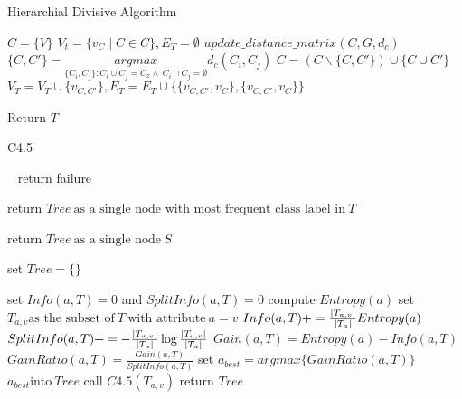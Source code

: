 \documentclass[a4paper]{article}
\begin{document}
  \begin{algorithm}
   \caption{Hierarchial Divisive Algorithm ~\cite{hda1}}
    \begin{algorithmic}[1]
     \State $C = \{ V\} $ 
     \State $V_t = \{v_C\mid C \in C\},E_T = \emptyset$ 
     \State $update\_distance\_matrix(C,G,d_c)$
     \State $\{C,C'\} =  \underset{\{C_i,C_j\}  : C_i \cup C_j = C_x   \wedge \  C_i \cap C_j = \emptyset}{argmax} d_c (C_i,C_j)$
     \State $C = (C \backslash \{C,C'\}) \cup \{C \cup C'\}$ 
     \State $V_T = V_T \cup \{v_{C,C'}\},E_T = E_T \cup \{\{v_{C,C'} ,v_{C}\},\{v_{C,C'} ,v_{C}\}\}$ 
     \EndWhile
    
      
        
       
       \State Return $T$



 

\end{algorithmic}
\end{algorithm}


 \begin{algorithm}
 
   \caption{C4.5  ~\cite{c4.5} }
    \begin{algorithmic}[1]
     \
      \State return failure
      \EndIf
      
      \State return $Tree \  \text{as a single node with most frequent class label in}\  T$ 
      \EndIf
     
      \State return $Tree \  \text{as a single node}\  S $ 
      \EndIf
      
   \State set $Tree = \{\}$
   
       \State set $Info(a,T) = 0$  and $SplitInfo(a,T) = 0$
       \State compute $Entropy(a)$
       \State set $T_{a,v}  \text{as the subset of} \  T \  \text{with attribute}\ a = v$  
       \State  $Info(a,T) + = \frac{\abs{T_{a,v}}}{\abs{T_{a}}} Entropy(a)$
       \State $SplitInfo(a,T)+= - \frac{\abs{T_{a,v}}}{\abs{T_{a}}} \log \frac{\abs{T_{a,v}}}{\abs{T_{a}}} $
          \EndFor
          \State $Gain(a,T) = Entropy(a) - Info(a,T)$
          \State  $GainRatio(a,T) = \frac{Gain(a,T)}{SplitInfo(a,T)}$
          \EndFor
       \State set $a_{best} = argmax \{GainRatio(a,T)\}$
       \State $a_{best} \text{into} \  Tree$
       call $C4.5(T_{a,v})$
        \EndFor
        \State return $Tree$
        
  \EndFunction
  

\end{algorithmic}
\end{algorithm}
\end{document}
